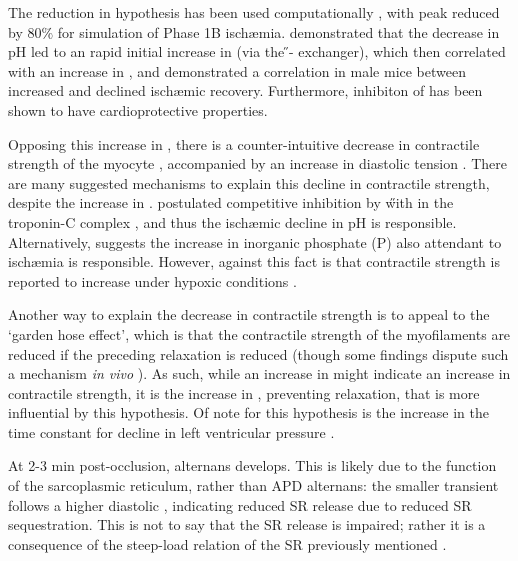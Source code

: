 \documentclass[../thesis-main.tex]{subfiles}
\begin{document}
The reduction in \inaca{} hypothesis has been used computationally \citep{Pollard2002}, with peak \inaca{} reduced by $80\%$ for simulation of Phase 1B isch\ae{}mia. \citet{Tani1989} demonstrated that the decrease in pH led to an rapid initial increase in \nai{} (via the \H{}-\na{} exchanger), which then correlated with an increase in \cai{}, and \citet{Cross1998} demonstrated a correlation in male mice between increased \inaca{} and declined isch\ae{}mic recovery. Furthermore, inhibiton of \inaca{} has been shown to have cardioprotective properties.

Opposing this increase in \cai{}, there is a counter-intuitive decrease in contractile strength of the myocyte \citep{Lee1988, Kaplan1992}, accompanied by an increase in diastolic tension \citep{Mubagwa1995}. There are many suggested mechanisms to explain this decline in contractile strength, despite the increase in \cai{}. \citet{Mohabir1991} postulated competitive inhibition by \H with \ca{} in the troponin-C complex \citep{Blanchard1984}, and thus the isch\ae{}mic decline in pH is responsible. Alternatively, \citet{Camacho1993} suggests the increase in inorganic phosphate (P) also attendant to isch\ae{}mia is responsible. However, against this fact is that contractile strength is reported to increase under hypoxic conditions \citep{Kihara1989}.

Another way to explain the decrease in contractile strength is to appeal to the `garden hose effect', which is that the contractile strength of the myofilaments are reduced if the preceding relaxation is reduced \citep{Camacho1993, Kleber1987, Kleber1987b, Vogel1982} (though some findings dispute such a mechanism \emph{in vivo} \citep{Zhao1988}). As such, while an increase in \casys{} might indicate an increase in contractile strength, it is the increase in \cadia{}, preventing relaxation, that is more influential by this hypothesis. Of note for this hypothesis is the increase in the time constant for decline in left ventricular pressure \citep{Serizawa1981, Applegate1987, Serizawa1987, Isoyama1987}.

At 2-3 min post-occlusion, \cai{} alternans develops. This is likely due to the function of the sarcoplasmic reticulum, rather than APD alternans: the smaller transient follows a higher diastolic \cai{}, indicating reduced SR release due to reduced SR sequestration. This is not to say that the SR release is impaired; rather it is a consequence of the steep-load relation of the SR previously mentioned \citep{Shiferaw2003, Restrepo2008}.
\end{document}
